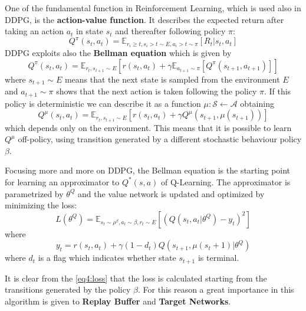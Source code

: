 \documentclass[a4paper, 11pt]{article}
\begin{document}
	One of the fundamental function in Reinforcement Learning, which is used also in DDPG, is the \textbf{action-value function}. It describes the expected return after taking an action $a_t$ in state $s_t$ and thereafter following policy $\pi$:
	\begin{equation}\label{eq1:actionvalue}
	Q^\pi(s_t, a_t) = \mathbb{E}_{r_i\geq t,s_{i} > t \sim \mathit{E}, a_i > t \sim \pi}[R_t|s_t,a_t]
	\end{equation}
	DDPG exploits also the \textbf{Bellman equation} which is given by
	\begin{equation}\label{eq2:bellman1}
	Q^\pi(s_t, a_t) = \mathbb{E}_{r_t,s_{t+1}\sim \mathit{E}}[r(s_t, a_t) + \gamma \mathbb{E}_{a_{t+1}\sim \pi}[Q^\pi(s_{t+1}, a_{t+1})]]
	\end{equation}
	where $s_{t+1}\sim \mathit{E}$ means that the next state is sampled from the environment $E$ and $a_{t+1}\sim \pi$ shows that the next action is taken following the policy $\pi$. If this policy is deterministic we can describe it as a function $ \mu : \mathcal{S} \leftarrow \mathcal{A}$ obtaining
	\begin{equation}\label{eq3:bellman2}
	Q^\mu(s_t, a_t) = \mathbb{E}_{r_t,s_{t+1}\sim \mathit{E}}[r(s_t, a_t) + \gamma Q^\mu(s_{t+1}, \mu(s_{t+1}))]
	\end{equation}
	which depends only on the environment. This means that it is possible to learn $Q^\mu$ off-policy, using transition generated by a different stochastic behaviour policy $\beta$.

	Focusing more and more on DDPG, the Bellman equation is the starting point for learning an approximator to $Q^*(s,a)$ of Q-Learning. The approximator is parametrized by $\theta^Q$ and the value network is updated and optimized by minimizing the loss:
	\begin{equation}\label{eq4:loss}
	L(\theta^Q) = \mathbb{E}_{s_t\sim \rho^\beta, a_t\sim \beta,r_t\sim E}[(Q(s_t, a_t|\theta^Q)-y_t)^2]
	\end{equation}
	where
	\begin{equation}\label{eq5:yt}
	y_t = r(s_t, a_t) + \gamma (1-d_t)Q(s_{t+1}, \mu(s_t+1)|\theta^Q)
	\end{equation}	
	where $d_t$ is a flag which indicates whether state $s_{t+1}$ is terminal.
	
	It is clear from the \vref{eq4:loss} that the loss is calculated starting from the transitions generated by the policy $\beta$. For this reason a great importance in this algorithm is given to \textbf{Replay Buffer} and \textbf{Target Networks}.
	
\end{document}
